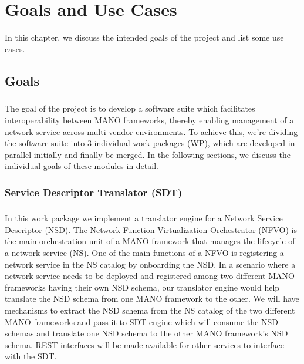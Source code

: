 \chapter{Goals and Use Cases}
\label{ch:Goals and Use Cases}

In this chapter, we discuss the intended goals of the project and list some use cases.

\section{Goals}

\paragraph{}
The goal of the project is to develop a software suite which facilitates interoperability between MANO frameworks, thereby enabling management of a network service across multi-vendor environments. To achieve this, we're dividing the software suite into 3 individual work packages (WP), which are developed in parallel initially and finally be merged. In the following sections, we discuss the individual goals of these modules in detail.

\subsection{Service Descriptor Translator (SDT)}
\paragraph{}

In this work package we implement a translator engine for a Network Service Descriptor (NSD). The Network Function Virtualization Orchestrator (NFVO) is the main orchestration unit of a MANO framework that manages the lifecycle of a network service (NS). One of the main functions of a NFVO is registering a network service in the NS catalog by onboarding the NSD. In a scenario where a network service needs to be deployed and registered among two different MANO
frameworks having their own NSD schema, our translator engine would help translate the NSD schema from one MANO framework to the other.
We will have mechanisms to extract the NSD schema from the NS catalog of the two different MANO frameworks and pass it to SDT engine which will consume the NSD schemas and translate one NSD schema to the other MANO framework's NSD schema. REST interfaces will be made available for other services to interface with the SDT.

